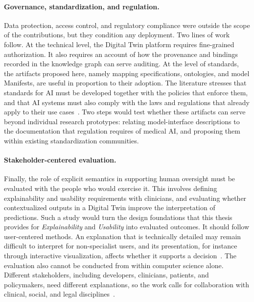 \paragraph{Governance, standardization, and regulation.}
Data protection, access control, and regulatory compliance were outside the scope of the contributions, but they condition any deployment. Two lines of work follow. At the technical level, the Digital Twin platform requires fine-grained authorization. It also requires an account of how the provenance and bindings recorded in the knowledge graph can serve auditing. At the level of standards, the artifacts proposed here, namely mapping specifications, ontologies, and model Manifests, are useful in proportion to their adoption. The literature stresses that standards for AI must be developed together with the policies that enforce them, and that AI systems must also comply with the laws and regulations that already apply to their use cases~\cite{kaur_trustworthy_2022}. Two steps would test whether these artifacts can serve beyond individual research prototypes: relating model-interface descriptions to the documentation that regulation requires of medical AI, and proposing them within existing standardization communities.

\paragraph{Stakeholder-centered evaluation.}
Finally, the role of explicit semantics in supporting human oversight must be evaluated with the people who would exercise it. This involves defining explainability and usability requirements with clinicians, and evaluating whether contextualized outputs in a Digital Twin improve the interpretation of predictions. Such a study would turn the design foundations that this thesis provides for \emph{Explainability} and \emph{Usability} into evaluated outcomes. It should follow user-centered methods. An explanation that is technically detailed may remain difficult to interpret for non-specialist users, and its presentation, for instance through interactive visualization, affects whether it supports a decision~\cite{naveed_overview_2024}. The evaluation also cannot be conducted from within computer science alone. Different stakeholders, including developers, clinicians, patients, and policymakers, need different explanations, so the work calls for collaboration with clinical, social, and legal disciplines~\cite{kaur_trustworthy_2022}.

